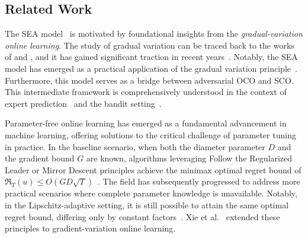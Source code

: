 \documentclass{article}
\renewcommand{\citet}{\citep}
\theoremstyle{plain}
\theoremstyle{definition}
\theoremstyle{remark}
\newcommand{\regret}{\mathfrak{R}}
\begin{document}
\subsection{Related Work} 
The SEA model~\cite{sachs2023accelerated} is motivated by foundational insights from the \emph{gradual-variation online learning}. The study of gradual variation can be traced back to the works of \citet{hazan2010extracting} and \citet{chiang2012online}, and it has gained significant traction in recent years~\cite{zhao2020dynamic,yan2023universal,zhao2024adaptivity,xie2024gradient,yan2024simple}. Notably, the SEA model has emerged as a practical application of the gradual variation principle~\cite{yan2023universal,xie2024gradient,yan2024simple}. Furthermore, this model serves as a bridge between adversarial OCO and SCO. This intermediate framework is comprehensively understood in the context of expert prediction~\cite{amir2020prediction,ito2021optimal} and the bandit setting~\cite{zimmert2019optimal,lee2021achieving}.

Parameter-free online learning has emerged as a fundamental advancement in machine learning, offering solutions to the critical challenge of parameter tuning in practice. In the baseline scenario, when both the diameter parameter $D$ and the gradient bound $G$ are known, algorithms leveraging Follow the Regularized Leader or Mirror Descent principles achieve the minimax optimal regret bound of  $\regret_T(u)\leq O(GD\sqrt{T})$~\cite{hazan2016introduction}. The field has subsequently progressed to address more practical scenarios where complete parameter knowledge is unavailable. Notably, in the Lipschitz-adaptive setting, it is still possible to attain the same optimal regret bound, differing only by constant factors~\cite{orabona2016coin,cutkosky2019artificial}. Xie et al.~\citet{xie2024gradient} extended these principles to gradient-variation online learning.
\end{document}

